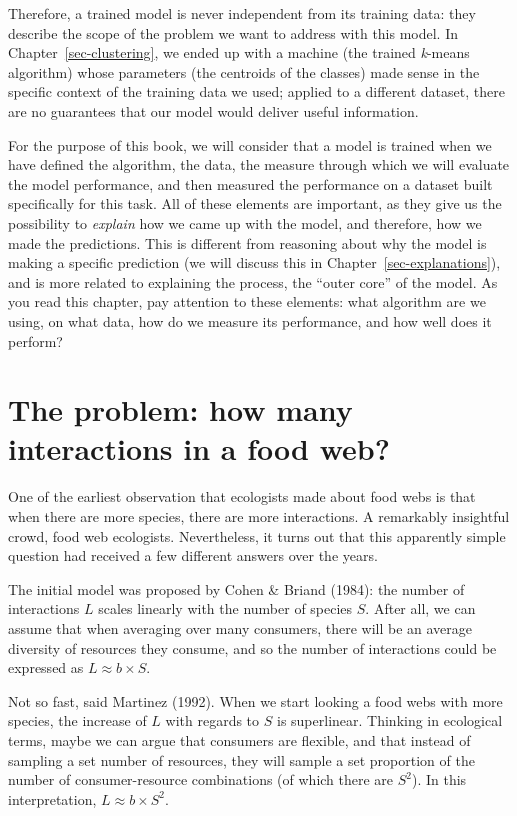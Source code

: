 \documentclass[
  letterpaper,
]{scrbook}
\begin{document}
Therefore, a trained model is never independent from its training data:
they describe the scope of the problem we want to address with this
model. In Chapter~\ref{sec-clustering}, we ended up with a machine (the
trained \emph{k}-means algorithm) whose parameters (the centroids of the
classes) made sense in the specific context of the training data we
used; applied to a different dataset, there are no guarantees that our
model would deliver useful information.

For the purpose of this book, we will consider that a model is trained
when we have defined the algorithm, the data, the measure through which
we will evaluate the model performance, and then measured the
performance on a dataset built specifically for this task. All of these
elements are important, as they give us the possibility to
\emph{explain} how we came up with the model, and therefore, how we made
the predictions. This is different from reasoning about why the model is
making a specific prediction (we will discuss this in
Chapter~\ref{sec-explanations}), and is more related to explaining the
process, the ``outer core'' of the model. As you read this chapter, pay
attention to these elements: what algorithm are we using, on what data,
how do we measure its performance, and how well does it perform?

\section{The problem: how many interactions in a food
web?}\label{sec-gradientdescent-problem}

One of the earliest observation that ecologists made about food webs is
that when there are more species, there are more interactions. A
remarkably insightful crowd, food web ecologists. Nevertheless, it turns
out that this apparently simple question had received a few different
answers over the years.

The initial model was proposed by Cohen \& Briand (1984): the number of
interactions \(L\) scales linearly with the number of species \(S\).
After all, we can assume that when averaging over many consumers, there
will be an average diversity of resources they consume, and so the
number of interactions could be expressed as \(L \approx b\times S\).

Not so fast, said Martinez (1992). When we start looking a food webs
with more species, the increase of \(L\) with regards to \(S\) is
superlinear. Thinking in ecological terms, maybe we can argue that
consumers are flexible, and that instead of sampling a set number of
resources, they will sample a set proportion of the number of
consumer-resource combinations (of which there are \(S^2\)). In this
interpretation, \(L \approx b\times S^2\).
\end{document}
